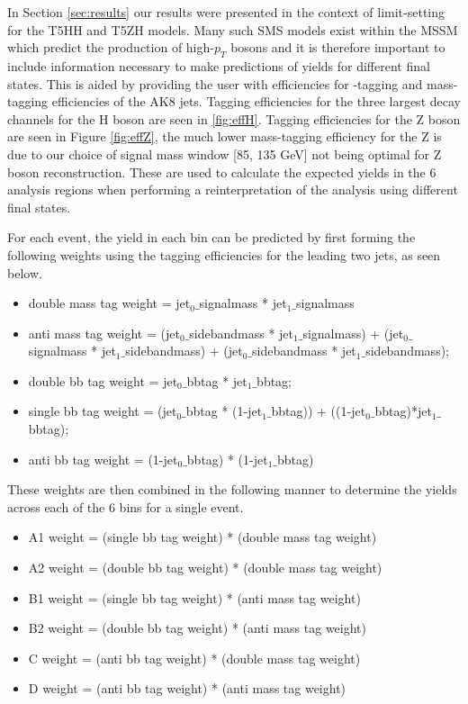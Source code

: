 In Section \ref{sec:results} our results were presented in the context of limit-setting for the T5HH and T5ZH models. Many such SMS models exist within the MSSM which predict the production of high-$p_{T}$ bosons and it is therefore important to include information necessary to make predictions of yields for different final states. This is aided by providing the user with efficiencies for \bbbar-tagging and mass-tagging efficiencies of the AK8 jets. Tagging efficiencies for the three largest decay channels for the H boson are seen in \ref{fig:effH}. Tagging efficiencies for the Z boson are seen in Figure \ref{fig:effZ}, the much lower mass-tagging efficiency for the Z is due to our choice of signal mass window [85, 135 GeV] not being optimal for Z boson reconstruction. These are used to calculate the expected yields in the 6 analysis regions when performing a reinterpretation of the analysis using different final states.

For each event, the yield in each bin can be predicted by first forming the following weights using the tagging efficiencies for the leading two jets, as seen below.

\begin{itemize}
\item double mass tag weight = jet$_{0}\_$signalmass * jet$_{1}\_$signalmass
\item anti mass tag weight = (jet$_{0}\_$sidebandmass * jet$_{1}\_$signalmass) + (jet$_{0}\_$signalmass * jet$_{1}\_$sidebandmass) + (jet$_{0}\_$sidebandmass * jet$_{1}\_$sidebandmass);
\item double bb tag weight = jet$_{0}\_$bbtag * jet$_{1}\_$bbtag;
\item single bb tag weight = (jet$_{0}\_$bbtag * (1-jet$_{1}\_$bbtag)) + ((1-jet$_{0}\_$bbtag)*jet$_{1}\_$bbtag);
\item anti bb tag weight = (1-jet$_{0}\_$bbtag) * (1-jet$_{1}\_$bbtag)
\end{itemize}

These weights are then combined in the following manner to determine the yields across each of the 6 bins for a single event.

\begin{itemize}
\item A1 weight = (single bb tag weight) * (double mass tag weight)
\item A2 weight = (double bb tag weight) * (double mass tag weight)
\item B1 weight = (single bb tag weight) * (anti mass tag weight)
\item B2 weight = (double bb tag weight) * (anti mass tag weight)
\item C weight = (anti bb tag weight) * (double mass tag weight)
\item D weight = (anti bb tag weight) * (anti mass tag weight)
\end{itemize}


